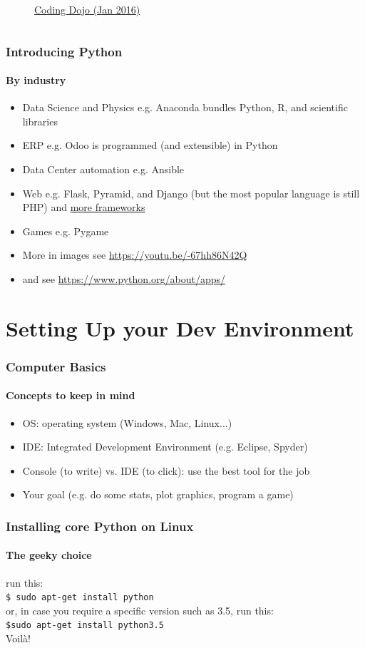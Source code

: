 \documentclass{beamer}
\begin{document}
\begin{frame}
\begin{columns}
\begin{figure}[h]
                \caption[font=tiny]{\href{http://www.codingdojo.com/blog/9-most-in-demand-programming-languages-of-2016/}{Coding Dojo (Jan 2016)}}
        	\end{figure}
	\end{columns}
	\end{frame}

	\begin{frame}
	\frametitle{Introducing Python}
	\framesubtitle{By industry}
	\begin{itemize}
		\item Data Science and Physics e.g. Anaconda bundles Python, R, and scientific libraries
		\item ERP e.g. Odoo is programmed (and extensible) in Python
		\item Data Center automation e.g. Ansible
		\item Web e.g. Flask, Pyramid, and Django (but the most popular language is still PHP) and \href{https://wiki.python.org/moin/WebFrameworks}{more frameworks}
		\item Games e.g. Pygame
		\item More in images see \url{https://youtu.be/-67hh86N42Q}
		\item and see \url{https://www.python.org/about/apps/}
	\end{itemize}
	\end{frame}

	
\section[Section]{Setting Up your Dev Environment}
	\begin{frame}
	\frametitle{Computer Basics}
	\framesubtitle{Concepts to keep in mind}
	\begin{itemize}
		\item OS: operating system (Windows, Mac, Linux...)
		\item IDE: Integrated Development Environment (e.g. Eclipse, Spyder)
		\item Console (to write) vs. IDE (to click): use the best tool for the job
		\item Your goal (e.g. do some stats, plot graphics, program a game)
	\end{itemize}
	\end{frame}

	\begin{frame}
	\frametitle{Installing core Python on Linux}
	\framesubtitle{The geeky choice}
	run  this:\\
	\texttt{\$ sudo apt-get install python}\\
	\vspace{1em}
	or, in case you require a specific version such as 3.5, run this:\\
	\texttt{\$sudo apt-get install python3.5}\\
	\vspace{1em}
	Voilà!
	\end{frame}
\end{document}
